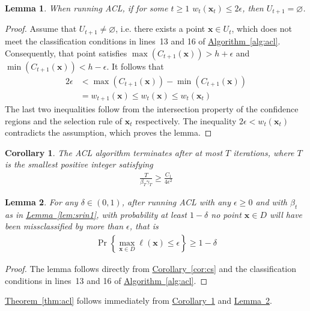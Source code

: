 \documentclass{article}
\def\*#1{\bm{#1}}
\newcommand{\algoref}[1]{\hyperref[#1]{\mbox{Algorithm~\ref*{#1}}}}
\newcommand{\theoremref}[1]{\hyperref[#1]{\mbox{Theorem~\ref*{#1}}}}
\newcommand{\lemmaref}[1]{\hyperref[#1]{\mbox{Lemma~\ref*{#1}}}}
\newcommand{\corref}[1]{\hyperref[#1]{\mbox{Corollary~\ref*{#1}}}}
\newtheorem{lemma}{Lemma}
\newtheorem{cor}{Corollary}
\newcommand{\acl}{\textsf{ACL}\xspace}
\begin{document}
\begin{lemma}
When running \acl, if for some $t \geq 1$ $w_t(\*x_t) \leq 2\epsilon$,
then $U_{t+1} = \varnothing$.
\end{lemma}
\begin{proof}
Assume that $U_{t+1} \neq \varnothing$, i.e. there exists a point
$\*x \in U_t$, which does not meet the classification conditions in
lines~13 and 16 of \algoref{alg:acl}. Consequently, that point
satisfies $\max(C_{t+1}(\*x)) > h + \epsilon$ and
$\min(C_{t+1}(\*x)) < h - \epsilon$. It follows that
\begin{align*}
2\epsilon &< \max(C_{t+1}(\*x)) - \min(C_{t+1}(\*x))\\
&= w_{t+1}(\*x) \leq w_t(\*x) \leq w_t(\*x_t)
\end{align*}
The last two inequalities follow from the intersection property of
the confidence regions and the selection rule of $\*x_t$ respectively.
The inequality $2\epsilon < w_t(\*x_t)$ contradicts the assumption, which
proves the lemma.
\end{proof}

\begin{cor}
\label{cor:iter}
The \acl algorithm terminates after at most $T$ iterations, where $T$
is the smallest positive integer satisfying
\begin{align*}
\frac{T}{\beta_T \gamma_T} \geq \frac{C_1}{4\epsilon^2}
\end{align*}
\end{cor}

\begin{lemma}
\label{lem:prob}
For any $\delta \in (0, 1)$, after running \acl with any $\epsilon \geq 0$
and with $\beta_t$ as in \lemmaref{lem:srin1}, with probability at least
$1-\delta$ no point $\*x \in D$ will have been missclassified by more
than $\epsilon$, that is
\begin{align*}
\Pr\left\{\max_{\*x\in D}\ell(\*x) \leq \epsilon\right\} \geq 1 - \delta
\end{align*}
\end{lemma}
\begin{proof}
The lemma follows directly from \corref{cor:cs} and the classification
conditions in lines~13 and 16 of \algoref{alg:acl}.
\end{proof}

\theoremref{thm:acl} follows immediately from \corref{cor:iter}
and \lemmaref{lem:prob}.

\end{document}
